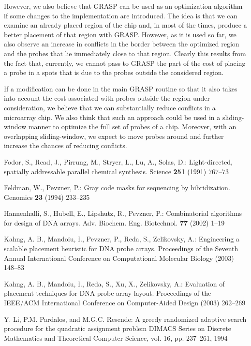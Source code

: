 \documentclass{article}
\begin{document}
However, we also believe that GRASP can be used as an optimization algorithm if some changes to the implementation are introduced. The idea is that we can examine an already placed region of the chip and, in most of the times, produce a better placement of that region with GRASP. However, as it is used so far, we also observe an increase in conflicts in the border between the optimized region and the probes that lie immediately close to that region. Clearly this results from the fact that, currently, we cannot pass to GRASP the part of the cost of placing a probe in a spots that is due to the probes outside the considered region. 

If a modification can be done in the main GRASP routine so that it also takes into account the cost associated with probes outside the region under consideration, we believe that we can substantially reduce conflicts in a microarray chip. We also think that such an approach could be used in a sliding-window manner to optimize the full set of probes of a chip. Moreover, with an overlapping sliding-window, we expect to move probes around and further increase the chances of reducing conflicts. 

\footnotesize

\begin{thebibliography}{99}

 Fodor, S., Read, J., Pirrung, M., Stryer, L., Lu, A., Solas, D.:
Light-directed, spatially addressable parallel chemical synthesis.
Science {\bfseries 251} (1991) 767--73

 Feldman, W., Pevzner, P.:
Gray code masks for sequencing by hibridization.
Genomics {\bfseries23} (1994) 233--235

 Hannenhalli, S., Hubell, E., Lipshutz, R., Pevzner, P.:
Combinatorial algorithms for design of DNA arrays.
Adv. Biochem. Eng. Biotechnol. {\bfseries77} (2002) 1--19

 Kahng, A. B., Mandoiu, I., Pevzner, P., Reda, S., Zelikovsky, A.:
Engineering a scalable placement heuristic for DNA probe arrays.
Proceedings of the Seventh Annual International Conference on Computational Molecular Biology (2003) 148--83

 Kahng, A. B., Mandoiu, I., Reda, S., Xu, X., Zelikovsky, A.:
Evaluation of placement techniques for DNA probe array layout.
Proceedings of the IEEE/ACM International Conference on Computer-Aided Design (2003) 262--269

 Y. Li, P.M. Pardalos, and M.G.C. Resende:
A greedy randomized adaptive search procedure for the quadratic assignment problem
DIMACS Series on Discrete Mathematics and Theoretical Computer Science, vol. 16, pp. 237--261, 1994

\end{thebibliography}
\end{document}
